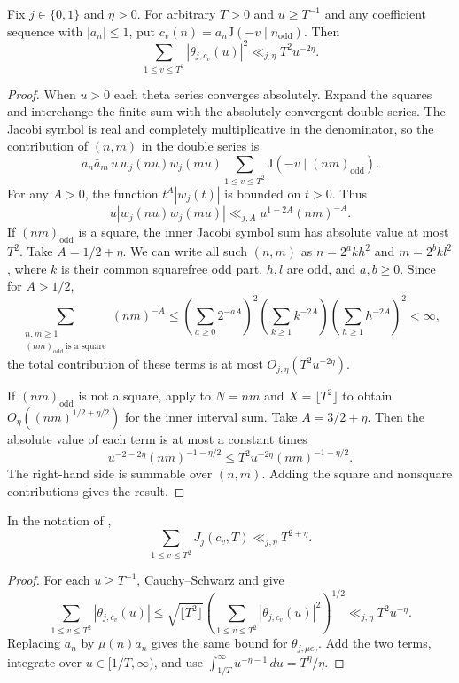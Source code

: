 \begin{lemma}
\label{lem:theta-second-moment}
\emitthmsource
Fix $j\in\{0,1\}$ and $\eta>0$. For arbitrary $T>0$ and $u\ge T^{-1}$ and any coefficient sequence with $|a_n|\le1$, put $c_v(n)=a_n\mathrm J(-v\mid n_{\mathrm{odd}})$. Then
\[
 \sum_{1\le v\le T^2}|\theta_{j,c_v}(u)|^2\ll_{j,\eta} T^2u^{-2\eta}.
\]
\end{lemma}
\begin{proof}
When $u>0$ each theta series converges absolutely. Expand the squares and interchange the finite sum with the absolutely convergent double series. The Jacobi symbol is real and completely multiplicative in the denominator, so the contribution of $(n,m)$ in the double series is
\[
 a_n\bar a_m\,u\,w_j(nu)w_j(mu)
 \sum_{1\le v\le T^2}\mathrm J(-v\mid(nm)_{\mathrm{odd}}).
\]
For any $A>0$, the function $t^A|w_j(t)|$ is bounded on $t>0$. Thus
\[
 u|w_j(nu)w_j(mu)|\ll_{j,A} u^{1-2A}(nm)^{-A}.
\]
If $(nm)_{\mathrm{odd}}$ is a square, the inner Jacobi symbol sum has absolute value at most $T^2$. Take $A=1/2+\eta$. We can write all such $(n,m)$ as $n=2^a k h^2$ and $m=2^b k l^2$, where $k$ is their common squarefree odd part, $h,l$ are odd, and $a,b\ge0$. Since for $A>1/2$,
\[
 \sum_{\substack{n,m\ge1\\(nm)_{\mathrm{odd}}\ \text{is a square}}}(nm)^{-A}
 \le\left(\sum_{a\ge0}2^{-aA}\right)^2
     \left(\sum_{k\ge1}k^{-2A}\right)
     \left(\sum_{h\ge1}h^{-2A}\right)^2<\infty,
\]
the total contribution of these terms is at most $O_{j,\eta}(T^2u^{-2\eta})$.

If $(nm)_{\mathrm{odd}}$ is not a square, apply  to $N=nm$ and $X=\lfloor T^2\rfloor$ to obtain $O_\eta((nm)^{1/2+\eta/2})$ for the inner interval sum. Take $A=3/2+\eta$. Then the absolute value of each term is at most a constant times
\[
 u^{-2-2\eta}(nm)^{-1-\eta/2}
 \le T^2u^{-2\eta}(nm)^{-1-\eta/2}.
\]
The right-hand side is summable over $(n,m)$. Adding the square and nonsquare contributions gives the result.
\end{proof}

\begin{lemma}
\label{lem:theta-tail-average}
\emitthmsource
In the notation of ,
\[
 \sum_{1\le v\le T^2}J_j(c_v,T)\ll_{j,\eta}T^{2+\eta}.
\]
\end{lemma}
\begin{proof}
For each $u\ge T^{-1}$, Cauchy--Schwarz and  give
\[
 \sum_{1\le v\le T^2}|\theta_{j,c_v}(u)|
 \le \sqrt{\lfloor T^2\rfloor}
       \left(\sum_{1\le v\le T^2}|\theta_{j,c_v}(u)|^2\right)^{1/2}
 \ll_{j,\eta} T^2u^{-\eta}.
\]
Replacing $a_n$ by $\mu(n)a_n$ gives the same bound for $\theta_{j,\mu c_v}$. Add the two terms, integrate over $u\in[1/T,\infty)$, and use $\int_{1/T}^\infty u^{-\eta-1}\,du=T^\eta/\eta$.
\end{proof}

